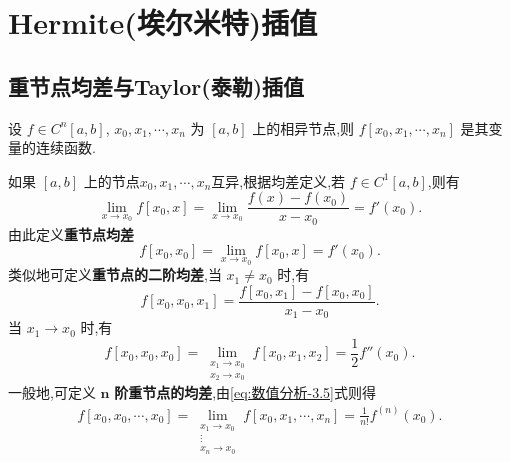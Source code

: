 \documentclass[../../main.tex]{subfiles}%
\begin{document}
\section{Hermite(埃尔米特)插值}

\subsection{重节点均差与Taylor(泰勒)插值}

\begin{theorem}
设 $f \in C^n[a, b]$, $x_0, x_1, \cdots, x_n$ 为 $[a, b]$ 上的相异节点,则 $f[x_0, x_1, \cdots, x_n]$ 是其变量的连续函数.
\end{theorem}

\begin{definition}[重节点均差]
如果 $[a, b]$ 上的节点$x_0,x_1,\cdots,x_n$互异,根据均差定义,若 $f \in C^1[a, b]$,则有
\[
\lim_{x \to x_0} f[x_0, x] = \lim_{x \to x_0} \frac{f(x) - f(x_0)}{x - x_0} = f'(x_0).
\]
由此定义\textbf{重节点均差}
\[
f[x_0, x_0] = \lim_{x \to x_0} f[x_0, x] = f'(x_0).
\]
类似地可定义\textbf{重节点的二阶均差},当 $x_1 \neq x_0$ 时,有
\[
f[x_0, x_0, x_1] = \frac{f[x_0, x_1] - f[x_0, x_0]}{x_1 - x_0}.
\]
当 $x_1 \to x_0$ 时,有
\[
f[x_0, x_0, x_0] = \lim_{\substack{x_1 \to x_0 \\ x_2 \to x_0}} f[x_0, x_1, x_2] = \frac{1}{2} f''(x_0).
\]
一般地,可定义 $\boldsymbol{n}$ \textbf{阶重节点的均差},由\eqref{eq:数值分析-3.5}式则得
\begin{align}
f[x_0, x_0, \cdots, x_0] = \lim_{\substack{x_1 \to x_0 \\ \vdots \\ x_n \to x_0}} f[x_0, x_1, \cdots, x_n] = \frac{1}{n!} f^{(n)}(x_0). \label{eq:数值分析-4.1}
\end{align}
\end{definition}
\end{document}
